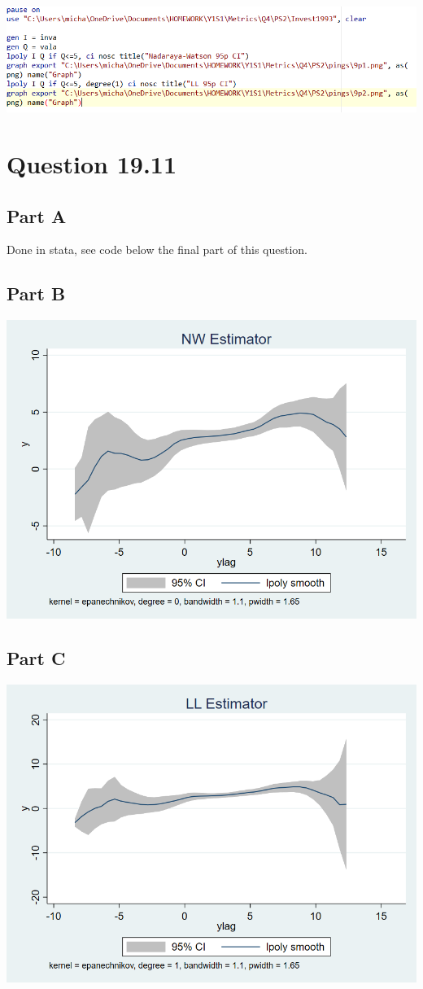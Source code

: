 \documentclass[11pt]{article} %
\begin{document}
\includegraphics[scale=0.7]{code9}
\section{Question 19.11}
\subsection{Part A}
Done in stata, see code below the final part of this question.
\subsection{Part B}
\includegraphics[scale=0.5]{11p1}
\subsection{Part C}
\includegraphics[scale=0.5]{11p2}
\end{document}
